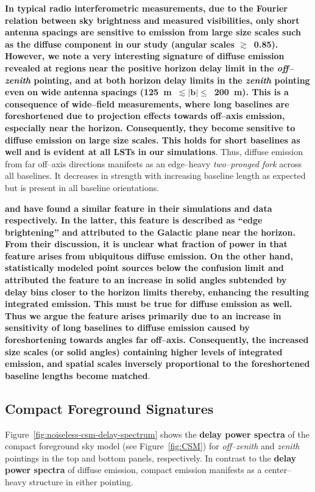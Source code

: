 \documentclass[preprint2,iop,numberedappendix]{emulateapj}
\begin{document}
{\bf In typical radio interferometric measurements, due to the Fourier relation between sky brightness and measured visibilities, only short antenna spacings are sensitive to emission from large size scales such as the diffuse component in our study (angular scales $\gtrsim$~0.85\arcdeg). However, we note a very interesting signature of diffuse emission revealed at regions near the positive horizon delay limit in the {\it off--zenith} pointing, and at both horizon delay limits in the {\it zenith} pointing even on wide antenna spacings (125~m~$\lesssim |\boldsymbol{b}|\le$~200~m). This is a consequence of wide--field measurements, where long baselines are foreshortened due to projection effects towards off--axis emission, especially near the horizon. Consequently, they become sensitive to diffuse emission on large size scales. This holds for short baselines as well and is evident at all LSTs in our simulations}. Thus, diffuse emission from far off--axis directions manifests as an edge--heavy {\it two--pronged fork} across all baselines. It decreases in strength with increasing baseline length as expected but is present in all baseline orientations.   

{\bf \citet{thy13} and \citet{pob13} have found a similar feature in their simulations and data respectively. In the latter, this feature is described as ``edge brightening'' and attributed to the Galactic plane near the horizon. From their discussion, it is unclear what fraction of power in that feature arises from ubiquitous diffuse emission. On the other hand, \citet{thy13} statistically modeled point sources below the confusion limit and attributed the feature to an increase in solid angles subtended by delay bins closer to the horizon limits thereby, enhancing the resulting integrated emission. This must be true for diffuse emission as well. Thus we argue the feature arises primarily due to an increase in sensitivity of long baselines to diffuse emission caused by foreshortening towards angles far off--axis. Consequently, the increased size scales (or solid angles) containing higher levels of integrated emission, and spatial scales inversely proportional to the foreshortened baseline lengths become matched}. 

\subsection{Compact Foreground Signatures}\label{sec:compact}

Figure~\ref{fig:noiseless-csm-delay-spectrum} shows the {\bf delay power spectra} of the compact foreground sky model (see Figure~\ref{fig:CSM}) for {\it off--zenith} and {\it zenith} pointings in the top and bottom panels, respectively. In contrast to the {\bf delay power spectra} of diffuse emission, compact emission manifests as a center--heavy structure in either pointing. 
\end{document}
